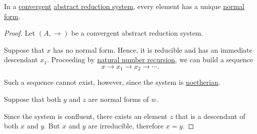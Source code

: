 \begin{proposition}\label{thm:convergent_reduction_system_normal_forms}
  In a \hyperref[def:abstract_rewriting_convergence/convergent]{convergent} \hyperref[def:abstract_reduction_system]{abstract reduction system}, every element has a unique \hyperref[def:abstract_reduction_system/normal_form]{normal form}.
\end{proposition}
\begin{proof}
  Let \( (A, \to) \) be a convergent abstract reduction system.

   Suppose that \( x \) has no normal form. Hence, it is reducible and has an immediate descendant \( x_1 \). Proceeding by \hyperref[rem:natural_number_recursion]{natural number recursion}, we can build a sequence
  \begin{equation*}
    x \to x_1 \to x_2 \to \cdots.
  \end{equation*}

  Such a sequence cannot exist, however, since the system is \hyperref[def:abstract_rewriting_convergence/noetherian]{noetherian}.

   Suppose that both \( y \) and \( z \) are normal forms of \( w \).

  Since the system is confluent, there exists an element \( z \) that is a descendant of both \( x \) and \( y \). But \( x \) and \( y \) are irreducible, therefore \( x = y \).
\end{proof}

